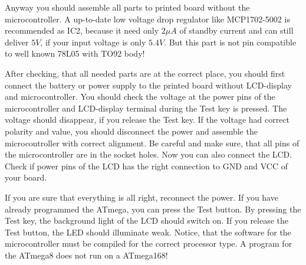 Anyway you should assemble all parts to printed board without the microcontroller.
A up-to-date low voltage drop regulator like MCP1702-5002 is recommended as IC2, because it
need only \(2\mu A\) of standby current and can still deliver \(5V\), if your input
voltage is only \(5.4V\). But this part is not pin compatible to well known 78L05 with TO92 body!

After checking, that all needed parts are at the correct place, you should
first connect the battery or power supply to the printed board without LCD-display
and microcontroller. You should check the voltage at the power pins of the
microcontroller and LCD-display terminal during the Test key is pressed.
The voltage should disappear, if you release the Test key.
If the voltage had correct polarity and value,
you should disconnect the power and assemble the microcontroller with correct
alignment. Be careful and make sure, that all pins of the microcontroller
are in the socket holes.
Now you can also connect the LCD. Check if power pins of the LCD has the right connection to
GND and VCC of your board.

If you are sure that everything is all right, reconnect the power. 
If you have already programmed the ATmega, you can press the Test button.
By pressing the Test key, the background light of the LCD should switch on.
If you release the Test button, the LED should illuminate weak.
Notice, that the software for the microcontroller must be compiled for the
correct processor type. A program for the ATmega8 does not run on a ATmega168!

